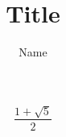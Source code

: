 \documentclass[11pt]{article}
\title{Title}
\author{Name}
\begin{document}
\maketitle

$$\frac{1+\sqrt{5}}{2}$$
\end{document}
